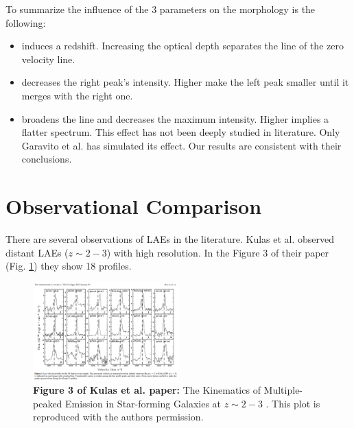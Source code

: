 \documentclass[twocolappendix]{latex/emulateapj}
\begin{document}
To summarize the influence of the 3 parameters on the \lya morphology is the following: 

\begin{itemize}
	\item \tauh induces a redshift. Increasing the optical depth separates the line of the zero velocity line. \\
	\item \vout decreases the right peak's intensity. Higher \vout make the left peak smaller until it merges with the right one. \\
	\item \vrot broadens the line and decreases the maximum intensity. Higher \vrot implies a flatter spectrum. This effect has not been deeply studied in literature. Only Garavito et al. \cite{Garavito14} has simulated its effect. Our results are consistent with their conclusions. 
\end{itemize}

\section{Observational Comparison}
\label{sec:comparisonobservations}

There are several observations of LAEs in the literature. Kulas et al. \cite{Kulas12} observed distant LAEs ($z\sim2-3$) with high resolution. In the Figure 3 of their paper (Fig. \ref{fig:kulas}) they show 18 \lya profiles. \\

\begin{figure}[h!]
	\begin{center}
		\includegraphics[width=0.5\textwidth]{./figures/figure3_kulas}
	\end{center}
	\caption{\textbf{Figure 3 of Kulas et al. paper:} The Kinematics of Multiple-peaked \lya Emission in Star-forming Galaxies at $z\sim2-3$ \cite{Kulas12}. This plot is reproduced with the authors permission.
		\label{fig:kulas}}
\end{figure}
\end{document}
